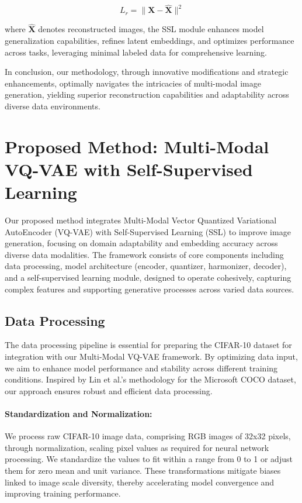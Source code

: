 \documentclass{article} %
\begin{document}
\[
L_r = \|\mathbf{X} - \hat{\mathbf{X}}\|^2
\]

where $\hat{\mathbf{X}}$ denotes reconstructed images, the SSL module enhances model generalization capabilities, refines latent embeddings, and optimizes performance across tasks, leveraging minimal labeled data for comprehensive learning.

In conclusion, our methodology, through innovative modifications and strategic enhancements, optimally navigates the intricacies of multi-modal image generation, yielding superior reconstruction capabilities and adaptability across diverse data environments.


\section{Proposed Method: Multi-Modal VQ-VAE with Self-Supervised Learning}

Our proposed method integrates Multi-Modal Vector Quantized Variational AutoEncoder (VQ-VAE) with Self-Supervised Learning (SSL) to improve image generation, focusing on domain adaptability and embedding accuracy across diverse data modalities. The framework consists of core components including data processing, model architecture (encoder, quantizer, harmonizer, decoder), and a self-supervised learning module, designed to operate cohesively, capturing complex features and supporting generative processes across varied data sources.

\subsection{Data Processing}

The data processing pipeline is essential for preparing the CIFAR-10 dataset for integration with our Multi-Modal VQ-VAE framework. By optimizing data input, we aim to enhance model performance and stability across different training conditions. Inspired by Lin et al.'s methodology for the Microsoft COCO dataset, our approach ensures robust and efficient data processing.

\paragraph{Standardization and Normalization:}

We process raw CIFAR-10 image data, comprising RGB images of 32x32 pixels, through normalization, scaling pixel values as required for neural network processing. We standardize the values to fit within a range from 0 to 1 or adjust them for zero mean and unit variance. These transformations mitigate biases linked to image scale diversity, thereby accelerating model convergence and improving training performance.
\end{document}
